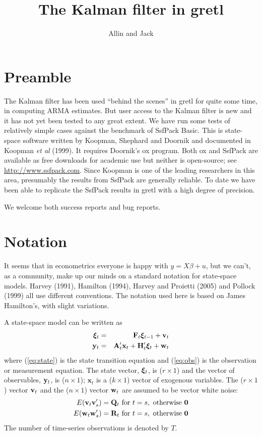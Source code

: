 \documentclass[a4paper]{article}
\title{The Kalman filter in gretl}
\author{Allin and Jack}
\newcommand{\obsvec}{\ensuremath\mathbf{y}}
\newcommand{\obsmat}{\ensuremath\mathbf{H}}
\newcommand{\obsx}{\ensuremath\mathbf{x}}
\newcommand{\obsxmat}{\ensuremath\mathbf{A}}
\newcommand{\obsdist}{\ensuremath\mathbf{w}}
\newcommand{\obsvar}{\ensuremath\mathbf{R}}
\newcommand{\statevec}{\ensuremath\mathbf{\bm \xi}}
\newcommand{\statemat}{\ensuremath\mathbf{F}}
\newcommand{\strdist}{\ensuremath\mathbf{v}}
\newcommand{\strvar}{\ensuremath\mathbf{Q}}
\begin{document}
\maketitle

\section{Preamble}
\label{sec:amble}

The Kalman filter has been used ``behind the scenes'' in gretl for
quite some time, in computing ARMA estimates.  But user access to the
Kalman filter is new and it has not yet been tested to any great
extent.  We have run some tests of relatively simple cases against the
benchmark of \textsf{SsfPack Basic}.  This is state-space software
written by Koopman, Shephard and Doornik and documented in Koopman
\textit{et al} (1999).  It requires Doornik's \textsf{ox} program.
Both \textsf{ox} and \textsf{SsfPack} are available as free downloads
for academic use but neither is open-source; see
\url{http://www.ssfpack.com}.  Since Koopman is one of the leading
researchers in this area, presumably the results from \textsf{SsfPack}
are generally reliable.  To date we have been able to replicate the
\textsf{SsfPack} results in gretl with a high degree of precision.

We welcome both success reports and bug reports.

\section{Notation}

It seems that in econometrics everyone is happy with $y = X \beta +
u$, but we can't, as a community, make up our minds on a standard
notation for state-space models. Harvey (1991), Hamilton (1994),
Harvey and Proietti (2005) and Pollock (1999) all use different
conventions. The notation used here is based on James Hamilton's, with
slight variations.

A state-space model can be written as
\begin{eqnarray}
  \label{eq:state}
  \statevec_{t} & = & \statemat_{t} \statevec_{t-1} + \strdist_t \\
  \label{eq:obs}
  \obsvec_t & = & \obsxmat_t'\obsx_t + \obsmat_t' \statevec_t + \obsdist_t
\end{eqnarray}
where (\ref{eq:state}) is the state transition equation and
(\ref{eq:obs}) is the observation or measurement equation.  The
state vector, $\statevec_{t}$, is ($r \times 1$) and the vector of
observables, $\obsvec_t$, is ($n \times 1$); $\mathbf{x}_t$ is a ($k
\times 1$) vector of exogenous variables.  The ($r \times 1$) vector
$\strdist_t$ and the ($n \times 1$) vector $\obsdist_t$ are assumed to
be vector white noise:
\begin{eqnarray*}
E(\strdist_t \strdist_s') = \strvar_t \mbox{ for } t = s, 
    \mbox{ otherwise } \mathbf{0} \\
E(\obsdist_t \obsdist_s') = \obsvar_t \mbox{ for } t = s, 
    \mbox{ otherwise } \mathbf{0}
\end{eqnarray*}
%
The number of time-series observations is denoted by $T$.
\end{document}

